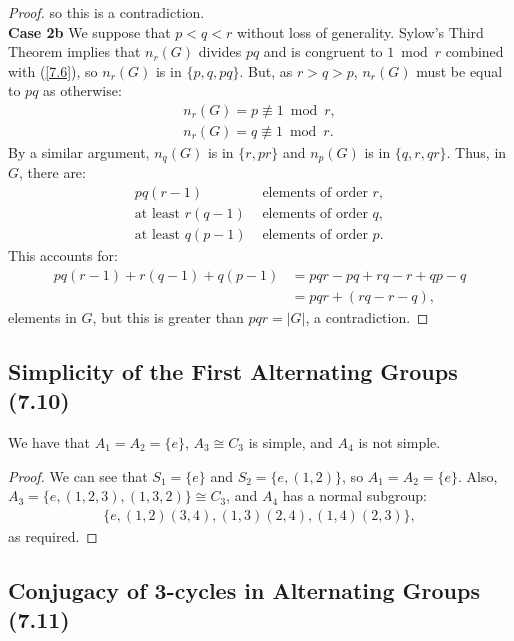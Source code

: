 \begin{proof}
    so this is a contradiction.
    \\[\baselineskip]
    \textbf{Case 2b} We suppose that $p < q < r$ without loss of
    generality. Sylow's Third Theorem implies that
    $n_r(G)$ divides $pq$ and is congruent to $1 \bmod r$
    combined with (\ref{7.6}), so $n_r(G)$ is in
    $\{p, q, pq\}$. But, as $r > q > p$, $n_r(G)$ must be
    equal to $pq$ as otherwise: \begin{align*}
        n_r(G) = p \not\equiv 1 \bmod r, \\ 
        n_r(G) = q \not\equiv 1 \bmod r.
    \end{align*} By a similar argument, $n_q(G)$ is in $\{r, pr\}$
    and $n_p(G)$ is in $\{q, r, qr\}$. Thus, in $G$,
    there are: \begin{align*}
        pq(r - 1) &\text{ elements of order } r, \\
        \text{at least } r(q - 1) &\text{ elements of order } q, \\
        \text{at least } q(p - 1) &\text{ elements of order } p.
    \end{align*} This accounts for: \begin{align*}
        pq(r - 1) + r(q - 1) + q(p - 1)
        &= pqr - pq + rq - r + qp - q \\
        &= pqr + (rq - r - q),
    \end{align*} elements in $G$, but this is greater than $pqr = |G|$,
    a contradiction.
\end{proof}

\subsection{Simplicity of the First Alternating Groups (7.10)} \label{7.10}

We have that $A_1 = A_2 = \{e\}$, $A_3 \cong C_3$ is simple, and
$A_4$ is not simple.

\begin{proof}
    We can see that $S_1 = \{e\}$ and $S_2 = \{e, (1, 2)\}$,
    so $A_1 = A_2 = \{e\}$. Also, $A_3 = \{e, (1, 2, 3), (1, 3, 2)\}
    \cong C_3$, and $A_4$ has a normal subgroup: \begin{align*}
        \{e, (1, 2)(3, 4), (1, 3)(2, 4), (1, 4)(2, 3)\},
    \end{align*} as required.
\end{proof}

\subsection{Conjugacy of 3-cycles in Alternating Groups (7.11)} \label{7.11}


